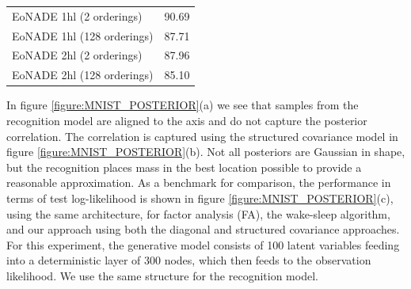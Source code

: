 \documentclass{article}
\begin{document}
\begin{bibunit}[icml2013]
\begin{table}[tbp]
\begin{tabular}{lc}
EoNADE 1hl (2 orderings) & 90.69 \\
EoNADE 1hl (128 orderings) & 87.71 \\
EoNADE 2hl (2 orderings) & 87.96 \\
EoNADE 2hl (128 orderings) & 85.10 \\
\hline
\end{tabular}
\vspace{-7mm}
\end{table}
\newline \newline In figure \ref{figure:MNIST_POSTERIOR}(a) we see that samples from the 
recognition model are aligned to the axis and do not capture the posterior 
correlation. The correlation is captured using the structured covariance model
in
figure \ref{figure:MNIST_POSTERIOR}(b).
Not all posteriors are Gaussian in shape, but the recognition places mass in 
the best location possible to provide a reasonable approximation. As a benchmark for comparison, the performance in terms of test log-likelihood 
is shown in figure \ref{figure:MNIST_POSTERIOR}(c), using the same 
architecture, for factor 
analysis (FA), the wake-sleep algorithm, 
and our approach using both the diagonal and structured covariance approaches. For this experiment, the generative model consists of 100 latent variables feeding into a deterministic layer of 300 nodes, which then feeds to the observation likelihood. We use the same structure for the recognition model.

\end{bibunit}
\end{document}

